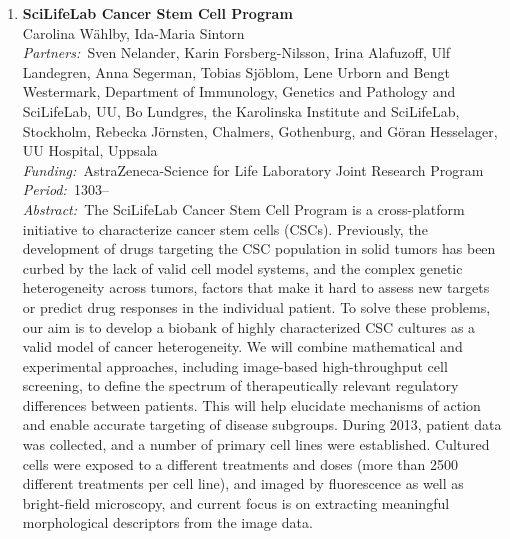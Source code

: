 \documentclass[10pt, a4paper]{article}
\newcommand{\aabstract}[1]{\emph{Abstract:~}#1}
\newcommand{\ffunding}[1]{\emph{Funding:~}#1\\}
\newcommand{\ppartners}[1]{\emph{Partners:~}#1\\}
\newcommand{\pperiod}[1]{\emph{Period:~}#1\\}
\begin{document}
\begin{enumerate}

\item
\label{proj:stemcells}
\textbf{SciLifeLab Cancer Stem Cell Program}\\
Carolina W\"{a}hlby, Ida-Maria Sintorn\\
\ppartners{Sven Nelander, Karin Forsberg-Nilsson, Irina Alafuzoff, Ulf Landegren, Anna Segerman, Tobias Sj\"{o}blom, Lene Urborn and Bengt Westermark, Department of Immunology, Genetics and Pathology and SciLifeLab, UU, Bo Lundgres, the Karolinska Institute and SciLifeLab, Stockholm, Rebecka J\"{o}rnsten, Chalmers, Gothenburg, and G\"{o}ran Hesselager, UU Hospital, Uppsala}
\ffunding{AstraZeneca-Science for Life Laboratory Joint Research Program}
\pperiod{1303--}
\aabstract{The SciLifeLab Cancer Stem Cell Program is a cross-platform initiative to characterize cancer stem cells (CSCs). Previously, the development of drugs targeting the CSC population in solid tumors has been curbed by the lack of valid cell model systems, and the complex genetic heterogeneity across tumors, factors that make it hard to assess new targets or predict drug responses in the individual patient. To solve these problems, our aim is to develop a biobank of highly characterized CSC cultures as a valid model of cancer heterogeneity. We will combine mathematical and experimental approaches, including image-based high-throughput cell screening, to define the spectrum of therapeutically relevant regulatory differences between patients. This will help elucidate mechanisms of action and enable accurate targeting of disease subgroups. During 2013, patient data was collected, and a number of primary cell lines were established. Cultured cells were exposed to a different treatments and doses (more than 2500 different treatments per cell line), and imaged by fluorescence as well as bright-field microscopy, and current focus is on extracting meaningful morphological descriptors from the image data.}



\end{enumerate}
\end{document}
